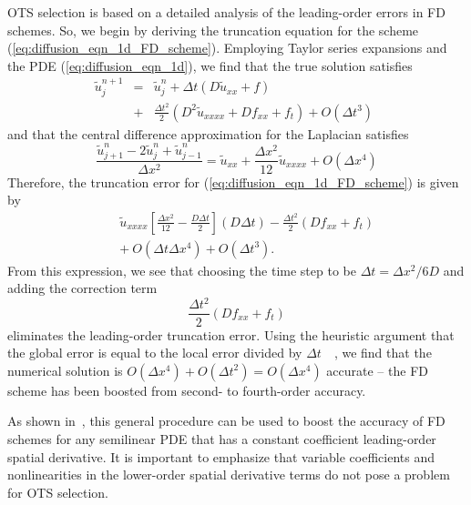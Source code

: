 \documentclass[twocolumn]{article} %
\newcommand{\beq}{\begin{equation}}
\newcommand{\eeq}{\end{equation}}
\newcommand{\bea}{\begin{eqnarray}}
\newcommand{\eea}{\end{eqnarray}}
\def\tu{\tilde{u}}
\def\dt{\Delta t}
\def\dx{\Delta x}
\begin{document}
OTS selection is based on a detailed analysis of the leading-order errors in 
FD schemes.  So, we begin by deriving the truncation equation for the scheme 
(\ref{eq:diffusion_eqn_1d_FD_scheme}).  Employing Taylor series expansions and 
the PDE (\ref{eq:diffusion_eqn_1d}), we find that the true solution satisfies
\bea
  \tu^{n+1}_j &=& \tu^{n}_j
  + \dt \left( D \tu_{xx} + f \right)
  \nonumber \\
  &+& \frac{\dt^2}{2} \left( D^2 \tu_{xxxx} + D f_{xx} + f_t \right)
  + O \left( \dt^3 \right) \ \ 
  \label{eq:diffusion_eqn_1d_time_err}
\eea
and that the central difference approximation for the Laplacian satisfies
\beq
  \frac{\tu^{n}_{j+1} -2 \tu^{n}_j + \tu^{n}_{j-1}}{\dx^2}  =
  \tu_{xx} + \frac{\dx^2}{12} \tu_{xxxx}
  + O(\dx^4)
  \label{eq:diffusion_eqn_1d_space_err}
\eeq
Therefore, the truncation error for (\ref{eq:diffusion_eqn_1d_FD_scheme})
is given by
\bea
  & & \tu_{xxxx}
  \left[ \frac{\dx^2}{12} - \frac{D \dt}{2} \right] (D \dt)
  - \frac{\dt^2}{2} \left( D f_{xx}
  + f_t \right)
  \nonumber \\
  & & + \ O(\dt \dx^4) + O(\dt^3).
  \label{eq:diffusion_eqn_1d_trunc_err}
\eea
From this expression, we see that choosing the time step to be
$\dt = \dx^2/6D$ and adding the correction term 
\beq
  \frac{\dt^2}{2} \left( D f_{xx} + f_t \right)
\eeq
eliminates the leading-order truncation error.  Using the heuristic
argument that the global error is equal to the local error divided by 
$\dt$~~\cite{gko_book}, we find that the numerical solution is 
$O(\dx^4) + O(\dt^2) = O(\dx^4)$ accurate -- the FD scheme has been
boosted from second- to fourth-order accuracy.

As shown in~\cite{chu_otspde}, this general procedure can be used to boost 
the accuracy of FD schemes for any semilinear PDE that has a constant 
coefficient leading-order spatial derivative.  It is important to emphasize 
that variable coefficients and nonlinearities in the lower-order spatial 
derivative terms do not pose a problem for OTS selection.  
\end{document}
